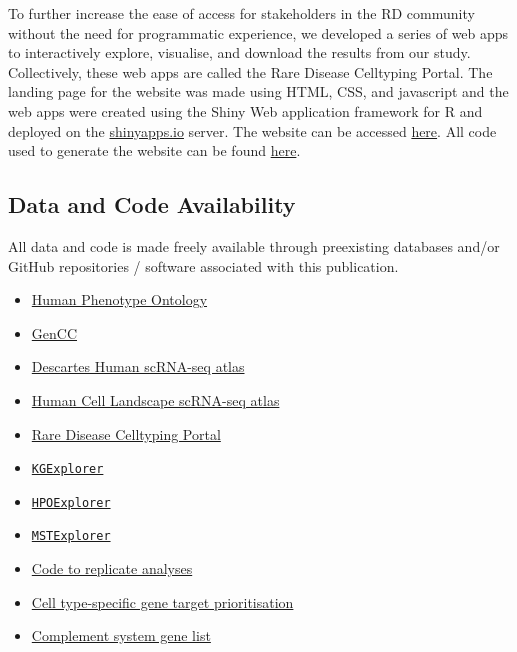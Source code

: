 \documentclass[
sn-nature
]{sn-jnl}
\providecommand{\tightlist}{%
  \setlength{\itemsep}{0pt}\setlength{\parskip}{0pt}}\usepackage{longtable,booktabs,array}
\begin{document}
To further increase the ease of access for stakeholders in the RD
community without the need for programmatic experience, we developed a
series of web apps to interactively explore, visualise, and download the
results from our study. Collectively, these web apps are called the Rare
Disease Celltyping Portal. The landing page for the website was made
using HTML, CSS, and javascript and the web apps were created using the
Shiny Web application framework for R and deployed on the
\href{https://www.shinyapps.io}{shinyapps.io} server. The website can be
accessed
\href{https://neurogenomics.github.io/rare_disease_celltyping_apps/home}{here}.
All code used to generate the website can be found
\href{https://github.com/neurogenomics/rare_disease_celltyping_apps}{here}.

\subsection{Data and Code
Availability}\label{data-and-code-availability}

All data and code is made freely available through preexisting databases
and/or GitHub repositories / software associated with this publication.

\begin{itemize}
\tightlist
\item
  \href{https://hpo.jax.org}{Human Phenotype Ontology}
\item
  \href{https://thegencc.org/}{GenCC}
\item
  \href{https://cellxgene.cziscience.com/collections/c114c20f-1ef4-49a5-9c2e-d965787fb90c}{Descartes
  Human scRNA-seq atlas}
\item
  \href{https://cellxgene.cziscience.com/collections/38833785-fac5-48fd-944a-0f62a4c23ed1}{Human
  Cell Landscape scRNA-seq atlas}
\item
  \href{https://neurogenomics.github.io/rare_disease_celltyping_apps/home}{Rare
  Disease Celltyping Portal}
\item
  \href{https://github.com/neurogenomics/KGExplorer}{\texttt{KGExplorer}}
\item
  \href{https://github.com/neurogenomics/HPOExplorer}{\texttt{HPOExplorer}}
\item
  \href{https://github.com/neurogenomics/MSTExplorer}{\texttt{MSTExplorer}}
\item
  \href{https://github.com/neurogenomics/rare_disease_celltyping}{Code
  to replicate analyses}
\item
  \href{https://neurogenomics.github.io/RareDiseasePrioritisation/reports/prioritise_targets}{Cell
  type-specific gene target prioritisation}\\
\item
  \href{https://www.genenames.org/data/genegroup/\#!/group/492}{Complement
  system gene list}
\end{itemize}
\end{document}
